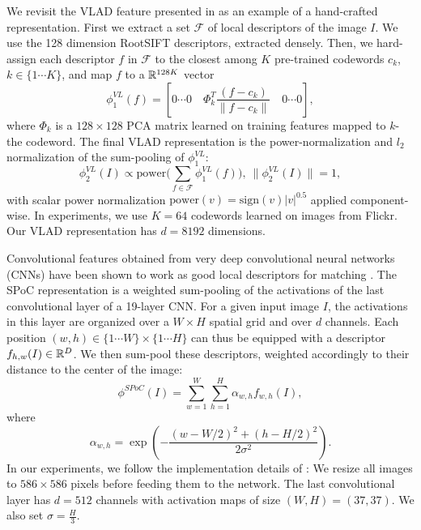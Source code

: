 We revisit the VLAD feature presented in \cite{VLAD} as an example of a hand-crafted representation. First we extract a set $\mathcal{F}$ of local descriptors of the image $I$. We use the 128 dimension RootSIFT \cite{3things} descriptors, extracted densely.
Then, we hard-assign each descriptor $f$ in $\mathcal{F}$ to the closest among $K$ pre-trained codewords $c_k$, $k\in\{1\cdots K\}$,
and map $f$ to a $\mathbb R^{128K}$ vector
\begin{equation}
\phi^{VL}_1(f) = \left[0 \cdots 0\quad \Phi_k^T\frac{(f-c_k)}{\|f-c_k\|} \quad 0 \cdots 0\right],
\end{equation}
where $\Phi_k$ is a $128\times 128$ PCA matrix learned on training features mapped to $k$-the codeword.
The final VLAD representation is the power-normalization and $l_2$ normalization of the sum-pooling of $\phi^{VL}_1$:
\begin{equation}
\phi^{VL}_2(I) \propto \mathrm{power}\big(\sum_{f\in \mathcal{F}}\phi^{VL}_1(f)\big),~\|\phi^{VL}_2(I)\|=1,
\end{equation}
with scalar power normalization $\mathrm{power}(v)=\mathrm{sign}(v)|v|^{0.5}$ applied component-wise.
In experiments, we use $K=64$ codewords learned on images from Flickr. Our VLAD representation has $d=8192$ dimensions.

Convolutional features obtained from very deep convolutional neural networks (CNNs) have been shown to work as good local descriptors for matching \cite{SimonZisser15}. The SPoC representation \cite{babenko15} is a weighted sum-pooling of the activations of the last convolutional layer of a 19-layer CNN. For a given input image $I$, the activations in this layer are organized over a $W\times H$ spatial grid and over $d$ channels. Each position $(w,h)\in \{1 \cdots W\}\times \{1\cdots H\}$ can thus be equipped with a descriptor $f_{h,w}(I)\in\mathbb R^D$.
We then sum-pool these descriptors, weighted accordingly to their distance to the center of the image:
\begin{equation}
    \phi^{SPoC}(I) = \sum_{w=1}^W\sum_{h=1}^H \alpha_{w,h}f_{w,h}(I),
\end{equation}
where
\begin{equation}
    \alpha_{w,h} = \exp \left(-\dfrac{(w-W/2)^2+(h-H/2)^2}{2\sigma^2}\right).
\end{equation}
In our experiments, we follow the implementation details of \cite{babenko15}: We resize all images to $586\times 586$ pixels before feeding them to the network. The last convolutional layer has $d=512$ channels with activation maps of size $(W,H)=(37,37)$. We also set $\sigma=\frac{H}{3}$.

